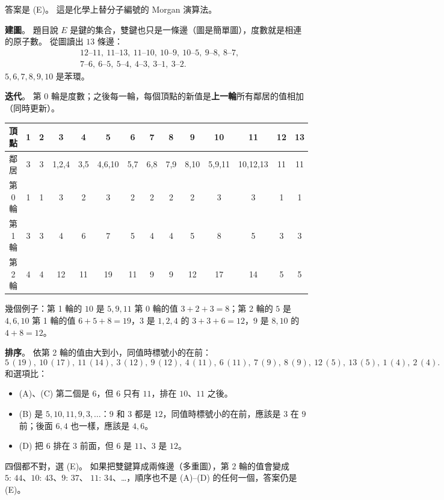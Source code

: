 \begin{pastsoln}
答案是 (E)。 這是化學上替分子編號的 Morgan 演算法。

\textbf{建圖}。 題目說 $E$ 是鍵的集合，雙鍵也只是一條邊（圖是簡單圖），度數就是相連的原子數。 從圖讀出 $13$ 條邊：
\[
\begin{aligned}
&12\text{--}11,\ 11\text{--}13,\ 11\text{--}10,\ 10\text{--}9,\ 10\text{--}5,\ 9\text{--}8,\ 8\text{--}7,\\
&7\text{--}6,\ 6\text{--}5,\ 5\text{--}4,\ 4\text{--}3,\ 3\text{--}1,\ 3\text{--}2 .
\end{aligned}
\]
$5, 6, 7, 8, 9, 10$ 是苯環。

\textbf{迭代}。 第 $0$ 輪是度數；之後每一輪，每個頂點的新值是\textbf{上一輪}所有鄰居的值相加（同時更新）。
\begin{center}
\small
\begin{tabular}{c|ccccccccccccc}
頂點 & 1 & 2 & 3 & 4 & 5 & 6 & 7 & 8 & 9 & 10 & 11 & 12 & 13 \\ \hline
鄰居 & 3 & 3 & 1,2,4 & 3,5 & 4,6,10 & 5,7 & 6,8 & 7,9 & 8,10 & 5,9,11 & 10,12,13 & 11 & 11 \\ \hline
第 0 輪 & 1 & 1 & 3 & 2 & 3 & 2 & 2 & 2 & 2 & 3 & 3 & 1 & 1 \\
第 1 輪 & 3 & 3 & 4 & 6 & 7 & 5 & 4 & 4 & 5 & 8 & 5 & 3 & 3 \\
第 2 輪 & 4 & 4 & 12 & 11 & 19 & 11 & 9 & 9 & 12 & 17 & 14 & 5 & 5
\end{tabular}
\end{center}
幾個例子：第 1 輪的 $10$ 是 $5, 9, 11$ 第 0 輪的值 $3 + 2 + 3 = 8$；第 2 輪的 $5$ 是 $4, 6, 10$ 第 1 輪的值
$6 + 5 + 8 = 19$，$3$ 是 $1, 2, 4$ 的 $3 + 3 + 6 = 12$，$9$ 是 $8, 10$ 的 $4 + 8 = 12$。

\textbf{排序}。 依第 2 輪的值由大到小，同值時標號小的在前：
\[
5\,(19),\ 10\,(17),\ 11\,(14),\ 3\,(12),\ 9\,(12),\ 4\,(11),\ 6\,(11),\ 7\,(9),\ 8\,(9),\ 12\,(5),\ 13\,(5),\ 1\,(4),\ 2\,(4).
\]
和選項比：
\begin{itemize}
\item (A)、(C) 第二個是 $6$，但 $6$ 只有 $11$，排在 $10$、$11$ 之後。
\item (B) 是 $5, 10, 11, 9, 3, \ldots$：$9$ 和 $3$ 都是 $12$，同值時標號小的在前，應該是 $3$ 在 $9$ 前；後面 $6, 4$
也一樣，應該是 $4, 6$。
\item (D) 把 $6$ 排在 $3$ 前面，但 $6$ 是 $11$、$3$ 是 $12$。
\end{itemize}
四個都不對，選 (E)。 如果把雙鍵算成兩條邊（多重圖），第 2 輪的值會變成 $5{:}\,44$、$10{:}\,43$、$9{:}\,37$、
$11{:}\,34$、\ldots，順序也不是 (A)--(D) 的任何一個，答案仍是 (E)。
\end{pastsoln}
